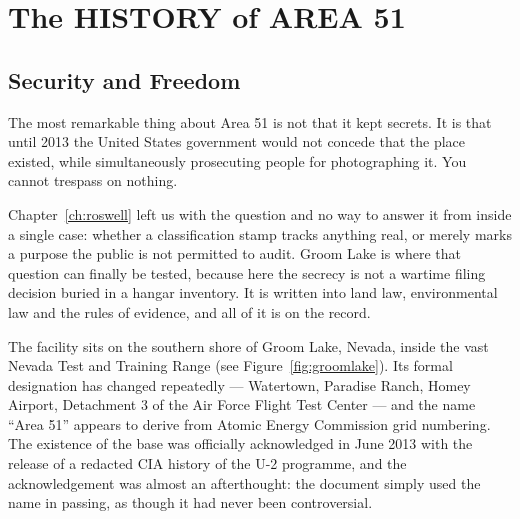 \chapter{The HISTORY of AREA 51}\label{ch:historyarea51}


\section{Security and Freedom}\label{sec:securityfeedom}

The most remarkable thing about Area 51 is not that it kept secrets. It is that until
2013 the United States government would not concede that the place existed, while
simultaneously prosecuting people for photographing it. You cannot trespass on nothing.

Chapter~\ref{ch:roswell} left us with the question and no way to answer it from inside a single
case: whether a classification stamp tracks anything real, or merely marks a purpose the public is
not permitted to audit. Groom Lake is where that question can finally be tested, because here the
secrecy is not a wartime filing decision buried in a hangar inventory. It is written into land law,
environmental law and the rules of evidence, and all of it is on the record.

The facility sits on the southern shore of Groom Lake, Nevada, inside the vast Nevada Test and Training Range (see Figure~\ref{fig:groomlake}). Its formal designation has changed repeatedly --- Watertown,
Paradise Ranch, Homey Airport, Detachment 3 of the Air Force Flight Test Center --- and
the name ``Area 51'' appears to derive from Atomic Energy Commission grid numbering. The
existence of the base was officially acknowledged in June 2013 with the release of a
redacted CIA history of the U-2 programme, and the acknowledgement was almost an
afterthought: the document simply used the name in passing, as though it had never been
controversial.

